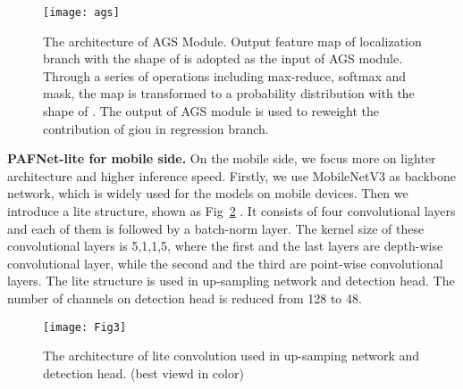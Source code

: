 \documentclass[10pt,twocolumn,letterpaper]{article}
\begin{document}
    \begin{figure}[h]
\begin{center}
            \centerline{\texttt{[image: ags]}}
            \caption{The architecture of AGS Module. Output feature map of localization branch with the shape of  is adopted as the input of AGS module. Through a series of operations including max-reduce, softmax and mask, the map is transformed to a probability distribution with the shape of . The output of AGS module is used to reweight the contribution of giou in regression branch.}
            \label{fig:ags} 
        \end{center}
\end{figure}

    \textbf{PAFNet-lite for mobile side.} On the mobile side, we focus more on lighter architecture and higher inference speed. Firstly, we use MobileNetV3 as backbone network, which is widely used for the models on mobile devices. Then we introduce a lite  structure, shown as Fig~\ref{Fig3} . It consists of four convolutional layers and each of them is followed by a batch-norm layer. The kernel size of these convolutional layers is 5,1,1,5, where the first and the last layers are depth-wise convolutional layer, while the second and the third are point-wise convolutional layers. The lite structure is used in up-sampling network and detection head. The number of channels on detection head is reduced from 128 to 48.
    
    \begin{figure}[h]
\begin{center}
			\centerline{\texttt{[image: Fig3]}}
			\caption{The architecture of lite convolution used in up-samping network and detection head. (best viewd in color)}
			\label{Fig3}
		\end{center}
\end{figure}
    
    
    
\end{document}
